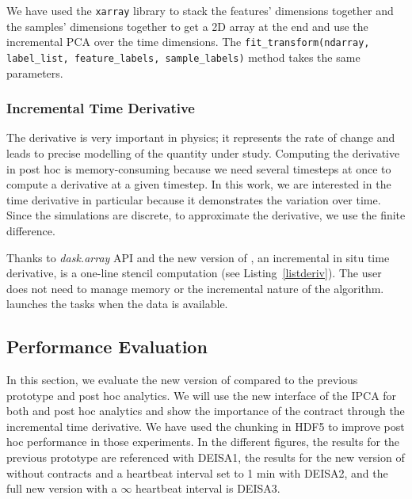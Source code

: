 We have used the \texttt{xarray} library to stack the features' dimensions together and the samples' dimensions together to get a 2D array at the end and use the incremental PCA over the time dimensions. The \texttt{fit\_transform(ndarray, label\_list, feature\_labels, sample\_labels)} method takes the same parameters.

\subsubsection{Incremental Time Derivative}

The derivative is very important in physics; it represents the rate of change and leads to precise modelling of the quantity under study. Computing the derivative in post hoc is memory-consuming because we need several timesteps at once to compute a derivative at a given timestep.
In this work, we are interested in the time derivative in particular because it demonstrates the variation over time. Since the simulations are discrete, to approximate the derivative, we use the finite difference\cite{fornberg_generation_1988}. 

Thanks to \textit{dask.array} API and the new version of \deisa, an incremental in situ time derivative, is a one-line stencil computation (see Listing~\ref{listderiv}). The user does not need to manage memory or the incremental nature of the algorithm. \dask launches the tasks when the data is available. 

\subsection{Performance Evaluation}
In this section, we evaluate the new version of \deisa compared to the previous prototype and post hoc analytics. We will use the new interface of the IPCA for both \deisa and post hoc analytics and show the importance of the contract through the incremental time derivative.
We have used the chunking in HDF5 to improve post hoc performance in those experiments.
In the different figures, the results for the previous \deisa prototype are referenced with DEISA1, 
the results for the new version of \deisa without contracts and a heartbeat interval set to 1 min with DEISA2, 
and the full new version with a $\infty$ heartbeat interval is DEISA3.

